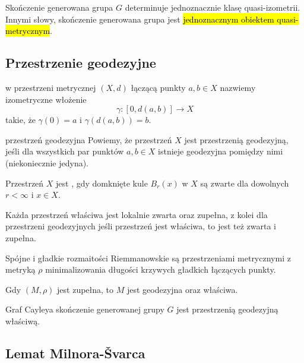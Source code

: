 \begin{conc}{}{}
  Skończenie generowana grupa $G$ determinuje jednoznacznie klasę quasi-izometrii. Innymi słowy, skończenie generowana grupa jest \hl{jednoznacznym obiektem quasi-metrycznym}.
\end{conc}

\subsection{Przestrzenie geodezyjne}

 w przestrzeni metrycznej $(X, d)$ łączącą punkty $a,b\in X$ nazwiemy izometryczne włożenie 
  $$\gamma:[0, d(a,b)]\to X$$
  takie, że $\gamma(0)=a$ i $\gamma(d(a,b))=b$.

\begin{definition}{przestrzeń geodezyjna}{}
  Powiemy, że przestrzeń $X$ jest przestrzenią geodezyjną, jeśli dla wszystkich par punktów $a,b\in X$ istnieje geodezyjna pomiędzy nimi (niekoniecznie jedyna).
\end{definition}

\begin{definition}{}{}
  Przestrzeń $X$ jest , gdy domknięte kule $B_r(x)$ w $X$ są zwarte dla dowolnych $r<\infty$ i $x\in X$.
\end{definition}

Każda przestrzeń właściwa jest lokalnie zwarta oraz zupełna, z kolei dla przestrzeni geode\-zyjnych jeśli przestrzeń jest właściwa, to jest też zwarta i zupełna.

\begin{example}[m]
\item Spójne i gładkie rozmaitości Riemmanowskie są przestrzeniami metrycznymi z metryką $\rho$ minimalizowania długości krzywych gładkich łączących punkty.

  Gdy $(M, \rho)$ jest zupełna, to $M$ jest geodezyjna oraz właściwa.

\item Graf Cayleya skończenie generowanej grupy $G$ jest przestrzenią geodezyjną właściwą.
\end{example}

\subsection{Lemat Milnora-\v{S}varca}

